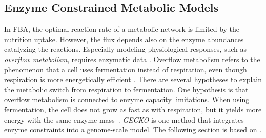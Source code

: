 \subsection{Enzyme Constrained Metabolic Models}
In FBA, the optimal reaction rate of a metabolic network is limited by the nutrition uptake. However, the flux depends also on the enzyme abundances catalyzing the reactions. Especially modeling physiological responses, such as \textit{overflow metabolism}, requires enzymatic data \cite{improving_phenotype_predictions}. Overflow metabolism refers to the phenomenon that a cell uses fermentation instead of respiration, even though respiration is more energetically efficient \cite{overflow}. There are several hypotheses to explain the metabolic switch from respiration to fermentation. One hypothesis is that overflow metabolism is connected to enzyme capacity limitations. When using fermentation, the cell does not grow as fast as with respiration, but it yields more energy with the same enzyme mass~\cite{improving_phenotype_predictions}.  
\textit{GECKO} is one method that integrates enzyme constraints into a genome-scale model. The following section is based on \cite{improving_phenotype_predictions}. 

